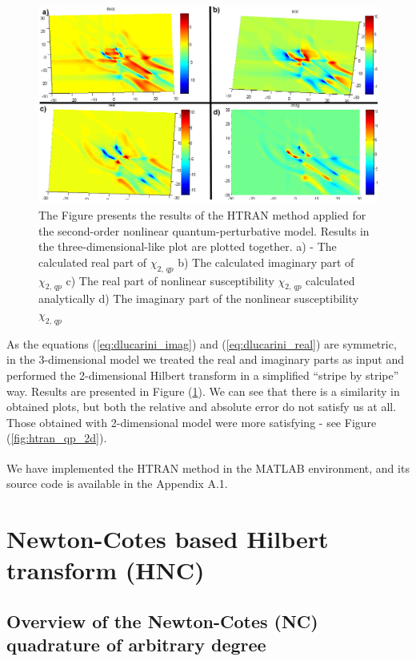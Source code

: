 \documentclass[12pt,twoside,a4paper]{article}
\numberwithin{equation}{subsection}
\numberwithin{figure}{subsection}
\begin{document}
\begin{figure}
  \includegraphics[width=150mm]{img/htran_qp_3d.png}
  \caption{The Figure presents the results of the HTRAN method applied for the second-order nonlinear quantum-perturbative model. Results
  in the three-dimensional-like plot are plotted together.
     a) - The calculated real part of ${\chi_{2, \, qp}}$ 
     b) The calculated imaginary part of ${\chi_{2, \, qp}}$ 
     c) The real part of nonlinear susceptibility ${\chi_{2, \, qp}}$ calculated analytically 
     d) The imaginary part of the nonlinear susceptibility ${\chi_{2, \, qp}}$
     \label{fig:htran_qp_3d}}
\end{figure}

As the equations (\ref{eq:dlucarini_imag}) and (\ref{eq:dlucarini_real}) are symmetric, in the 3-dimensional model we treated the real and
imaginary parts as input and performed the 2-dimensional Hilbert transform in a simplified ``stripe by stripe'' way. Results are
presented in Figure (\ref{fig:htran_qp_3d}). We can see that there is a similarity in obtained plots, but both the relative and absolute
error do not satisfy us at all. Those obtained with 2-dimensional model were more satisfying - see Figure (\ref{fig:htran_qp_2d}).

We have implemented the HTRAN method in the MATLAB \textsuperscript{\textregistered} environment, and its source code is available in
the Appendix A.1.

\section{Newton-Cotes based Hilbert transform (HNC)} \label{chap:nc}

\subsection{Overview of the Newton-Cotes (NC) quadrature of arbitrary degree}  \label{chap:nc_quadrature}
\end{document}
